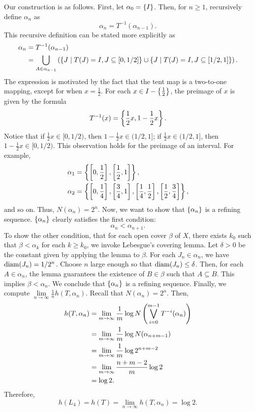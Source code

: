 \documentclass[12pt,twoside,draft]{book}
\begin{document}
Our construction is as follows.
First, let $\alpha_0 = \left \{ I \right \}$.
Then, for $n \geq 1$, recursively define $\alpha_n$ as
\begin{equation*}
  \alpha_n = T^{-1}(\alpha_{n-1}).
\end{equation*}
%
This recursive definition can be stated more explicitly as
\begin{align*}
  \alpha_n &= T^{-1}(\alpha_{n-1}) \\
  &= \bigcup\limits_{A \in \alpha_{n-1}} \left (  \left \{ J \mathrel{} \middle| \mathrel{} T(J) = I, J \subseteq [0,1/2] \right \} \cup \left \{ J \mathrel{} \middle| \mathrel{} T(J) = I, J \subseteq [1/2,1] \right \} \right ).
\end{align*}
The expression is motivated by the fact that the tent map is a two-to-one mapping, except for when $x = \frac{1}{2}$.
For each $x \in I - \left \{ \frac{1}{2} \right \}$, the preimage of $x$ is given by the formula
\begin{equation*}
  T^{-1}(x) = \left \{ \frac{1}{2} x, 1 - \frac{1}{2} x \right \}.
\end{equation*}
Notice that if $\frac{1}{2} x \in [0,1/2)$, then $1 - \frac{1}{2} x \in (1/2,1]$; if $\frac{1}{2} x \in (1/2,1]$, then $1 - \frac{1}{2} x \in [0,1/2)$.
This observation holds for the preimage of an interval.
For example,
\begin{align*}
  \alpha_1 &= \left \{ \left [ 0,\frac{1}{2} \right ], \left [ \frac{1}{2}, 1 \right ] \right \}, \\
  \alpha_2 &= \left \{ \left [ 0,\frac{1}{4} \right ], \left [ \frac{3}{4}, 1 \right ], \left [ \frac{1}{4}, \frac{1}{2} \right ], \left [ \frac{1}{2}, \frac{3}{4} \right ] \right \},
\end{align*}
and so on.
Thus, $N(\alpha_{n}) = 2^n$.
Now, we want to show that $\left \{ \alpha_n \right \}$ is a refining sequence.
$\left \{ \alpha_n \right \}$ clearly satisfies the first condition:
\begin{equation*}
  \alpha_n < \alpha_{n+1}.
\end{equation*}
To show the other condition, that for each open cover $\beta$ of $X$, there exists $k_0$ such that $\beta < \alpha_k$ for each $k \geq k_0$, we invoke Lebesgue's covering lemma.
Let $\delta > 0$ be the constant given by applying the lemma to $\beta$.
For each $J_n \in \alpha_n$, we have $\mathrm{diam}(J_n) = 1/{2^n}$.
Choose $n$ large enough so that $\mathrm{diam}(J_n) \leq \delta$.
Then, for each $A \in \alpha_n$, the lemma guarantees the existence of $B \in \beta$ such that $A \subseteq B$.
This implies $\beta < \alpha_n$.
We conclude that $\left \{ \alpha_n \right \}$ is a refining sequence.
Finally, we compute $\lim\limits_{n \to \infty} \frac{1}{n} h(T, \alpha_n)$.
Recall that $N(\alpha_{n}) = 2^n$.
Then,
\begin{align*}
  h(T, \alpha_n)
  &= \lim\limits_{m \to \infty} \frac{1}{m} \log N\left (  \bigvee\limits_{i = 0}^{m-1} T^{-i}(\alpha_n) \right )  \\
  &= \lim\limits_{m \to \infty} \frac{1}{m} \log N(\alpha_{n+m-1})  \\
  &= \lim\limits_{m \to \infty} \frac{1}{m} \log 2^{n + m - 2}  \\
  &= \lim\limits_{m \to \infty} \frac{n + m - 2}{m} \log 2 \\
  &= \log 2.
\end{align*}
Therefore,
\begin{equation*}
  h(L_4) = h(T) = \lim\limits_{n \to \infty} h(T, \alpha_n) = \log 2.
\end{equation*}




\printindex
\end{document}

